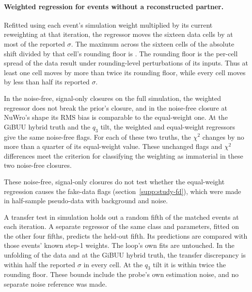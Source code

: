\paragraph{Weighted regression for events without a reconstructed partner.} Refitted using each event's simulation weight multiplied by its current reweighting at that iteration, the regressor moves the sixteen data cells by at most  of the reported $\sigma$. The maximum across the sixteen cells of the absolute shift divided by that cell's rounding floor is . The rounding floor is the per-cell spread of the data result under rounding-level perturbations of its inputs. Thus at least one cell moves by more than twice its rounding floor, while every cell moves by less than half its reported $\sigma$.

In the noise-free, signal-only closures on the full simulation, the weighted regressor does not break the prior's closure, and in the noise-free closure at NuWro's shape its RMS bias is comparable to the equal-weight one. At the GiBUU hybrid truth and the $q_3$ tilt, the weighted and equal-weight regressors give the same noise-free flags. For each of these two truths, the $\chi^2$ changes by no more than a quarter of its equal-weight value. These unchanged flags and $\chi^2$ differences meet the criterion for classifying the weighting as immaterial in these two noise-free closures.

These noise-free, signal-only closures do not test whether the equal-weight regression causes the fake-data flags (section~\ref{supp:study-fd}), which were made in half-sample pseudo-data with background and noise.

A transfer test in simulation holds out a random fifth of the matched events at each iteration. A separate regressor of the same class and parameters, fitted on the other four fifths, predicts the held-out fifth. Its predictions are compared with those events' known step-1 weights. The loop's own fits are untouched. In the unfolding of the data and at the GiBUU hybrid truth, the transfer discrepancy is within half the reported $\sigma$ in every cell. At the $q_3$ tilt it is within twice the rounding floor. These bounds include the probe's own estimation noise, and no separate noise reference was made.

